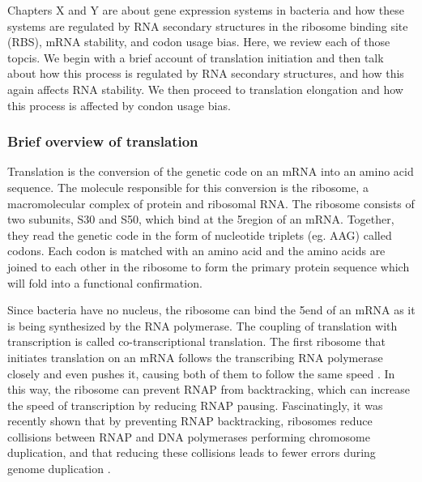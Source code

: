 %
Chapters X and Y are about gene expression systems in bacteria and how
these systems are regulated by RNA secondary structures in the ribosome binding
site (RBS), mRNA stability, and codon usage bias. Here, we review each of those
topcis. We begin with a brief account of translation initiation and then talk
about how this process is regulated by RNA secondary structures, and how this
again affects RNA stability. We then proceed to translation elongation and how
this process is affected by condon usage bias.

\subsubsection{Brief overview of translation}
Translation is the conversion of the genetic code on an mRNA into an amino acid
sequence. The molecule responsible for this conversion is the ribosome, a
macromolecular complex of protein and ribosomal RNA. The ribosome consists of
two subunits, S30 and S50, which bind at the 5\p region of an mRNA.
Together, they read the genetic code in the form of nucleotide triplets (eg.
AAG) called codons. Each codon is matched with an amino acid and the amino
acids are joined to each other in the ribosome to form the primary protein
sequence which will fold into a functional confirmation.

Since bacteria have no nucleus, the ribosome can bind the 5\p end of an mRNA as
it is being synthesized by the RNA polymerase. The coupling of translation with
transcription is called co-transcriptional translation. The first ribosome that
initiates translation on an mRNA follows the transcribing RNA polymerase
closely and even pushes it, causing both of them to follow the same speed
\cite{proshkin_cooperation_2010}. In this way, the ribosome can prevent RNAP
from backtracking, which can increase the speed of transcription by reducing
RNAP pausing. Fascinatingly, it was recently shown that by preventing RNAP
backtracking, ribosomes reduce collisions between RNAP and DNA polymerases
performing chromosome duplication, and that reducing these collisions leads to
fewer errors during genome duplication \cite{dutta_linking_2011}.

